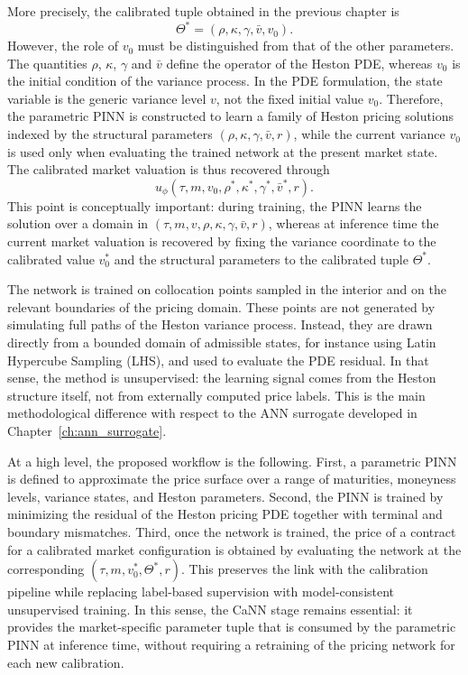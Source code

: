 More precisely, the calibrated tuple obtained in the previous chapter is
\[
\Theta^*=(\rho,\kappa,\gamma,\bar v,v_0).
\]
However, the role of $v_0$ must be distinguished from that of the other parameters. The quantities $\rho$, $\kappa$, $\gamma$ and $\bar v$ define the operator of the Heston PDE, whereas $v_0$ is the initial condition of the variance process. In the PDE formulation, the state variable is the generic variance level $v$, not the fixed initial value $v_0$. Therefore, the parametric PINN is constructed to learn a family of Heston pricing solutions indexed by the structural parameters $(\rho,\kappa,\gamma,\bar v,r)$, while the current variance $v_0$ is used only when evaluating the trained network at the present market state. The calibrated market valuation is thus recovered through
\[
u_\phi(\tau,m,v_0,\rho^*,\kappa^*,\gamma^*,\bar v^*,r).
\]
This point is conceptually important: during training, the PINN learns the solution over a domain in $(\tau,m,v,\rho,\kappa,\gamma,\bar v,r)$, whereas at inference time the current market valuation is recovered by fixing the variance coordinate to the calibrated value $v_0^*$ and the structural parameters to the calibrated tuple $\Theta^*$.

The network is trained on collocation points sampled in the interior and on the relevant boundaries of the pricing domain. These points are not generated by simulating full paths of the Heston variance process. Instead, they are drawn directly from a bounded domain of admissible states, for instance using Latin Hypercube Sampling (LHS), and used to evaluate the PDE residual. In that sense, the method is unsupervised: the learning signal comes from the Heston structure itself, not from externally computed price labels. This is the main methodological difference with respect to the ANN surrogate developed in Chapter~\ref{ch:ann_surrogate}.

At a high level, the proposed workflow is the following. First, a parametric PINN is defined to approximate the price surface over a range of maturities, moneyness levels, variance states, and Heston parameters. Second, the PINN is trained by minimizing the residual of the Heston pricing PDE together with terminal and boundary mismatches. Third, once the network is trained, the price of a contract for a calibrated market configuration is obtained by evaluating the network at the corresponding $(\tau,m,v_0^*,\Theta^*,r)$. This preserves the link with the calibration pipeline while replacing label-based supervision with model-consistent unsupervised training. In this sense, the CaNN stage remains essential: it provides the market-specific parameter tuple that is consumed by the parametric PINN at inference time, without requiring a retraining of the pricing network for each new calibration.

